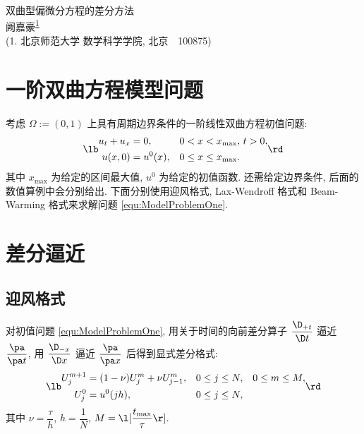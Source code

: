 \documentclass[UTF8, a4paper, 12pt, oneside, onecolumn]{article}
\def\homeworkName{双曲型偏微分方程的差分方法}
\begin{document}
\thispagestyle{plain}

\begin{center}
	{\heiti \homeworkName} \\
	\vspace{1.5ex}
	{\fangsong 阙嘉豪\textsuperscript{\hyperref[auth:1]{1}}} \\
	{\songti \label{auth:1}(1. 北京师范大学 数学科学学院, 北京~~100875)}
\end{center}



\section{一阶双曲方程模型问题}

考虑 $\Omega := (0, 1)$ 上具有周期边界条件的一阶线性双曲方程初值问题:
\begin{equation}\label{equ:ModelProblemOne}
	\lb\begin{aligned}
		u_t + u_{x} &= 0,	&	0 < x < x_{\max },&~t > 0,\\%
		u(x, 0) &= u^0(x),	&	0 \leq x \leq x_{\max }.&	\\
	\end{aligned}\rd
\end{equation}
其中 $x_{\max }$ 为给定的区间最大值, $u^0$ 为给定的初值函数. 还需给定边界条件, 后面的数值算例中会分别给出. 下面分别使用迎风格式, Lax-Wendroff 格式和 Beam-Warming 格式来求解问题 \eqref{equ:ModelProblemOne}.

\section{差分逼近}

\subsection{迎风格式}

对初值问题 \eqref{equ:ModelProblemOne}, 用关于时间的向前差分算子 $\dfrac{\D_{+t}}{\D t}$ 逼近 $\dfrac{\pa }{\pa t}$, 用 $\dfrac{\D_{-x}}{\D x}$ 逼近 $\dfrac{\pa }{\pa x}$ 后得到显式差分格式:
\begin{equation}
	\lb\begin{aligned}
		U_{j}^{m + 1} &= (1 - \nu ) U_j^m + \nu U_{j - 1}^m,	&	0 &\leq j \leq N,	&	0	\leq m \leq M,\\
		U_j^0 &= u^0(jh),	&	0 &\leq j \leq N,	&
	\end{aligned}\rd
\end{equation}
其中 $\nu = \dfrac{\tau }{h}$, $h = \dfrac{1}{N}$, $M = \l[\dfrac{t_{\max}}{\tau }\r]$.
\end{document}
